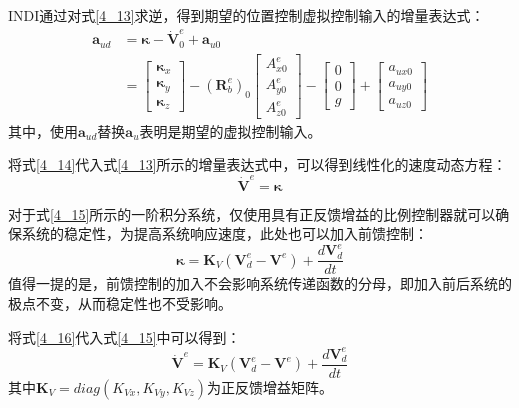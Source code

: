 INDI通过对式\eqref{4_13}求逆，得到期望的位置控制虚拟控制输入的增量表达式： 
\begin{equation}
    \begin{aligned}
        \boldsymbol{a}_{ud}&=\boldsymbol{\kappa}-\boldsymbol{\dot{V}}^e_0+\boldsymbol{a}_{u0}\\
        &=\begin{bmatrix}\boldsymbol{\kappa}_x \\\boldsymbol{\kappa}_y \\\boldsymbol{\kappa}_z\end{bmatrix}-
        (\boldsymbol{R}_b^e)_0\begin{bmatrix}A_{x0}^e \\A_{y0}^e \\A_{z0}^e\end{bmatrix}-
        \begin{bmatrix}0 \\0 \\g\end{bmatrix}+
        \begin{bmatrix}a_{ux0} \\a_{uy0} \\a_{uz0}\end{bmatrix}
    \end{aligned}
    \label{4_14}
\end{equation}
其中，使用$\boldsymbol{a}_{ud}$替换$\boldsymbol{a}_{u}$表明是期望的虚拟控制输入。

将式\eqref{4_14}代入式\eqref{4_13}所示的增量表达式中，可以得到线性化的速度动态方程：
\begin{equation}
    \dot{\boldsymbol V}^e=\boldsymbol{\kappa}
    \label{4_15}
\end{equation}

对于式\eqref{4_15}所示的一阶积分系统，仅使用具有正反馈增益的比例控制器就可以确保系统的稳定性，为提高系统响应速度，此处也可以加入前馈控制：
\begin{equation}
    \boldsymbol{\kappa}=\boldsymbol{K}_{V}(\boldsymbol{V}_d^e-\boldsymbol{V}^e)+\frac{d\boldsymbol{V}^e_d}{dt}
    \label{4_16}
\end{equation}
值得一提的是，前馈控制的加入不会影响系统传递函数的分母，即加入前后系统的极点不变，从而稳定性也不受影响。

将式\eqref{4_16}代入式\eqref{4_15}中可以得到：
\begin{equation}
    \dot{\boldsymbol V}^e=\boldsymbol{K}_{V}(\boldsymbol{V}_d^e-\boldsymbol{V}^e)+\frac{d\boldsymbol{V}^e_d}{dt}
    \label{4_17}
\end{equation}
其中$\boldsymbol{K}_V=diag({K}_{V x},{K}_{V y},{K}_{V z})$为正反馈增益矩阵。

